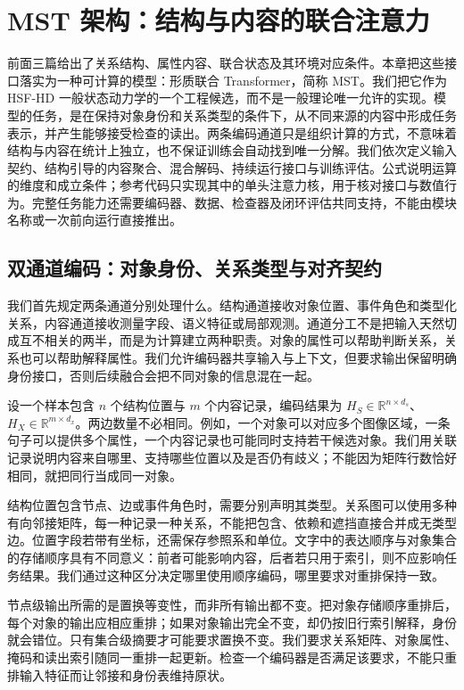 \chapter{MST 架构：结构与内容的联合注意力}
\label{chp:mst_architecture}

前面三篇给出了关系结构、属性内容、联合状态及其环境对应条件。本章把这些接口落实为一种可计算的模型：形质联合 Transformer，简称 MST。我们把它作为 HSF-HD 一般状态动力学的一个工程候选，而不是一般理论唯一允许的实现。模型的任务，是在保持对象身份和关系类型的条件下，从不同来源的内容中形成任务表示，并产生能够接受检查的读出。两条编码通道只是组织计算的方式，不意味着结构与内容在统计上独立，也不保证训练会自动找到唯一分解。我们依次定义输入契约、结构引导的内容聚合、混合解码、持续运行接口与训练评估。公式说明运算的维度和成立条件；参考代码只实现其中的单头注意力核，用于核对接口与数值行为。完整任务能力还需要编码器、数据、检查器及闭环评估共同支持，不能由模块名称或一次前向运行直接推出。

\section{双通道编码：对象身份、关系类型与对齐契约}
\label{sec:dual_encoder}

我们首先规定两条通道分别处理什么。结构通道接收对象位置、事件角色和类型化关系，内容通道接收测量字段、语义特征或局部观测。通道分工不是把输入天然切成互不相关的两半，而是为计算建立两种职责。对象的属性可以帮助判断关系，关系也可以帮助解释属性。我们允许编码器共享输入与上下文，但要求输出保留明确身份接口，否则后续融合会把不同对象的信息混在一起。

设一个样本包含 $n$ 个结构位置与 $m$ 个内容记录，编码结果为 $H_S\in\mathbb R^{n\times d_s}$、$H_X\in\mathbb R^{m\times d_x}$。两边数量不必相同。例如，一个对象可以对应多个图像区域，一条句子可以提供多个属性，一个内容记录也可能同时支持若干候选对象。我们用关联记录说明内容来自哪里、支持哪些位置以及是否仍有歧义；不能因为矩阵行数恰好相同，就把同行当成同一对象。

结构位置包含节点、边或事件角色时，需要分别声明其类型。关系图可以使用多种有向邻接矩阵，每一种记录一种关系，不能把包含、依赖和遮挡直接合并成无类型边。位置字段若带有坐标，还需保存参照系和单位。文字中的表达顺序与对象集合的存储顺序具有不同意义：前者可能影响内容，后者若只用于索引，则不应影响任务结果。我们通过这种区分决定哪里使用顺序编码，哪里要求对重排保持一致。

节点级输出所需的是置换等变性，而非所有输出都不变。把对象存储顺序重排后，每个对象的输出应相应重排；如果对象输出完全不变，却仍按旧行索引解释，身份就会错位。只有集合级摘要才可能要求置换不变。我们要求关系矩阵、对象属性、掩码和读出索引随同一重排一起更新。检查一个编码器是否满足该要求，不能只重排输入特征而让邻接和身份表维持原状。

